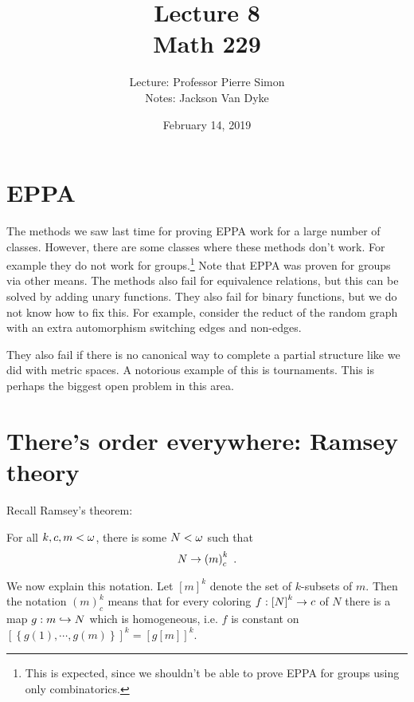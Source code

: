 \documentclass{amsart}
\begin{document}
\title{Lecture 8\\Math 229}
\author{Lecture: Professor Pierre Simon\\Notes: Jackson Van Dyke}
\date{February 14, 2019}
\maketitle

\section{EPPA}

The methods we saw last time for proving EPPA work for a large number of classes. 
However, there are some
classes where these methods don't work. For example they do not work for
groups.\footnote{This is expected, since we shouldn't be able to prove EPPA for groups
using only combinatorics.}
Note that EPPA was proven for groups via other means.
The methods also fail for equivalence relations, but this can be solved by adding unary
functions. They also fail for binary functions, but we do not know how to fix
this. For example, consider the reduct of the random graph with an extra automorphism
switching edges and non-edges. 

They also fail if there is no canonical way to complete a partial structure like we did
with metric spaces. A notorious example of this is tournaments. This is perhaps the
biggest open problem in this area.

\section{There's order everywhere: Ramsey theory}

Recall Ramsey's theorem:

\begin{thm}[Ramsey]
For all $k,c,m < \omega$, there is some $N < \omega$ such that
\begin{equation}
N\rightarrow \left( m \right)_c^k \ .
\end{equation}
\end{thm}

We now explain this notation. Let $\left[ m \right]^k$ denote the set of $k$-subsets of $m$.
Then the notation $\left( m \right)_c^k$ means that for every coloring
$f: \left[ N\right]^k \rightarrow c$ of $N$ there is a map $g:m\hookrightarrow N$ which is homogeneous, i.e. $f$
is constant on $\left[ \left\{ g\left( 1 \right) , \cdots , g\left( m \right) \right\}
\right]^k = \left[ g\left[ m \right] \right]^k$.
\end{document}
